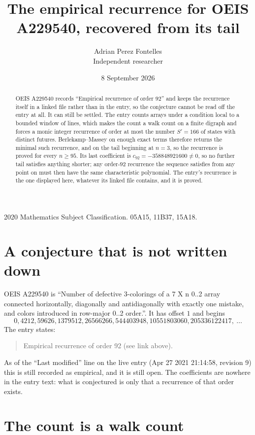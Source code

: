 \documentclass[11pt,a4paper]{article}
\title{The empirical recurrence for OEIS A229540, recovered from its tail}
\author{Adrian Perez Fontelles\\ \small Independent researcher}
\date{8 September 2026}
\theoremstyle{plain}
\theoremstyle{definition}
\begin{document}
\maketitle

\begin{abstract}
OEIS A229540 records ``Empirical recurrence of order $92$'' and keeps the recurrence itself in
a linked file rather than in the entry, so the conjecture cannot be read off the entry at all.
It can still be settled. The entry counts arrays under a condition local to a bounded window of
lines, which makes the count a walk count on a finite digraph and forces a monic integer
recurrence of order at most the number $S'=166$ of states with distinct futures. Berlekamp--Massey on
enough exact terms therefore returns the minimal such recurrence, and on the tail beginning at $n=3$, so the recurrence is proved for every $n\ge95$.
Its last coefficient is $c_{92}=-358848921600\neq0$, so no further tail satisfies anything
shorter; any order-$92$ recurrence the sequence satisfies from any point on must then have
the same characteristic polynomial. The entry's recurrence is the one displayed here, whatever
its linked file contains, and it is proved.
\end{abstract}

\noindent\small 2020 Mathematics Subject Classification. 05A15, 11B37, 15A18.\normalsize

\section{A conjecture that is not written down}

OEIS A229540 is ``Number of defective 3-colorings of a 7 X n 0..2 array connected horizontally, diagonally and antidiagonally with exactly one mistake, and colors introduced in row-major 0..2 order.''. It has offset $1$ and begins
\[
0, 4212, 59626, 1379512, 26566266, 544403948, 10551803060, 205336122417,\ \dots
\]
The entry states:
\begin{quote}
Empirical recurrence of order 92 (see link above).
\end{quote}
As of the ``Last modified'' line on the live entry (Apr 27 2021 21:14:58, revision 9)
this is still recorded as empirical, and it is still open. The coefficients are nowhere in the
entry text: what is conjectured is only that a recurrence of that order exists.

\section{The count is a walk count}
\end{document}
